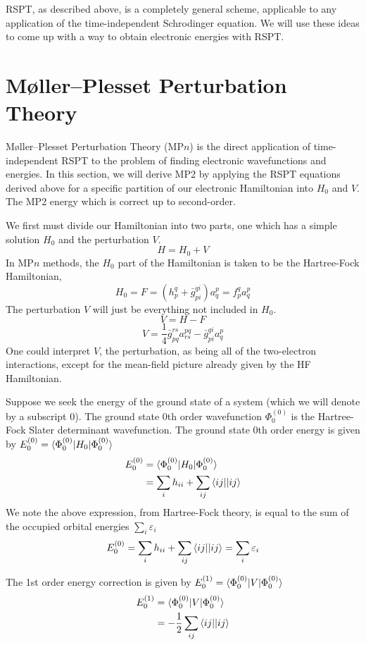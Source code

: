 \documentclass{article}
\newcommand{\eps}{\varepsilon}
\begin{document}
RSPT, as described above, is a completely general scheme, applicable to any application of the time-independent Schrodinger equation.
We will use these ideas to come up with a way to obtain electronic energies with RSPT. 

\section{M{\o}ller--Plesset Perturbation Theory}
M{\o}ller--Plesset Perturbation Theory (MP$n$) is the direct application of time-independent RSPT to the problem of finding electronic wavefunctions and energies.
In this section, we will derive MP2 by applying the RSPT equations derived above for a specific partition of our electronic Hamiltonian into $H_0$ and $V$.
The MP2 energy which is correct up to second-order.

We first must divide our Hamiltonian into two parts, one which has a simple solution $H_0$ and the perturbation $V$.
\[H = H_0 + V \]
In MP$n$ methods, the $H_0$ part of the Hamiltonian is taken to be the Hartree-Fock Hamiltonian,
\[H_0 = F = (h_p^q + \bar{g}_{pi}^{qi}) a_q^p = f_p^q a_q^p  \]
The perturbation $V$ will just be everything not included in $H_0$. 
\[V = H - F \]
\[V =  \frac{1}{4} \bar{g}_{pq}^{rs} a_{rs}^{pq} - \bar{g}_{pi}^{qi} a_{q}^{p}  \]
One could interpret $V$, the perturbation, as being all of the two-electron interactions, except for the mean-field picture already given by the HF Hamiltonian.

Suppose we seek the energy of the ground state of a system (which we will denote by a subscript 0).
The ground state 0th order wavefunction $\Phi_0^{(0)}$ is the Hartree-Fock Slater determinant wavefunction. 
The ground state 0th order energy is given by $E_0^{(0)} = \braket{\Phi_0^{(0)} | H_0 | \Phi_0^{(0)}}$
\begin{align*}
E_0^{(0)} &= \braket{\Phi_0^{(0)} | H_0 | \Phi_0^{(0)}} \\
          &= \sum_i h_{ii} + \sum_{ij} \braket{ij||ij}  
\end{align*}
We note the above expression, from Hartree-Fock theory, is equal to the sum of the occupied orbital energies $\sum_i \eps_i$
\[E_0^{(0)} = \sum_i h_{ii} + \sum_{ij} \braket{ij||ij} = \sum_i \eps_i  \]

The 1st order energy correction is given by $E_0^{(1)} = \braket{\Phi_0^{(0)} | V | \Phi_0^{(0)}}$
\begin{align*}
E_0^{(1)} &= \braket{\Phi_0^{(0)} | V | \Phi_0^{(0)}} \\
          &= -\frac{1}{2} \sum_{ij} \braket{ij||ij} 
\end{align*}
\end{document}
